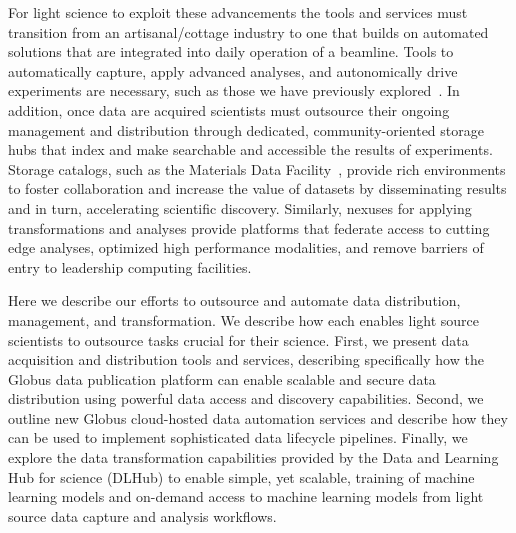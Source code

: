 \documentclass{aip-cp}
\begin{document}
For light science to exploit these advancements the tools and services must transition from an
artisanal/cottage industry to one that builds on 
automated solutions that are integrated into daily operation of a 
beamline. Tools to automatically capture, apply advanced analyses, and autonomically drive 
experiments are necessary, such as those we have previously explored~\cite{wozniak2015big}. In 
addition, once data are acquired scientists must outsource their ongoing management and 
distribution through dedicated, community-oriented storage hubs that index and make searchable and 
accessible the results of experiments. Storage catalogs, such as the Materials Data 
Facility~\cite{MDF2016}, provide rich environments to foster collaboration and increase the value 
of datasets by disseminating results and in turn, accelerating scientific discovery. Similarly, 
nexuses for applying transformations and analyses provide platforms that federate access to cutting 
edge analyses, optimized high performance modalities, and remove barriers of entry to leadership 
computing facilities.


Here we describe our efforts to outsource and automate
data distribution, management, and transformation. We
describe how each enables light source scientists to 
outsource tasks crucial for their science.
First, we present data acquisition and distribution tools and services, 
describing specifically how the Globus data publication platform can enable scalable and 
secure data distribution using powerful data access and discovery capabilities. 
Second, we outline new Globus cloud-hosted data automation 
services and describe how they can be used to implement sophisticated data lifecycle pipelines. 
Finally, we explore the data transformation capabilities 
provided by the Data and Learning Hub for science (DLHub) 
to enable simple, yet scalable, training of machine learning models
and on-demand access to machine learning models from light source data capture
and analysis workflows.
\end{document}
